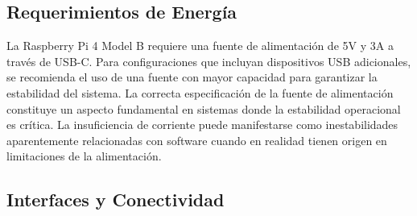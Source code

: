 \subsection{Requerimientos de Energía}

La Raspberry Pi 4 Model B requiere una fuente de alimentación de 5V y 3A a través de USB-C. Para configuraciones que incluyan dispositivos USB adicionales, se recomienda el uso de una fuente con mayor capacidad para garantizar la estabilidad del sistema. La correcta especificación de la fuente de alimentación constituye un aspecto fundamental en sistemas donde la estabilidad operacional es crítica. La insuficiencia de corriente puede manifestarse como inestabilidades aparentemente relacionadas con software cuando en realidad tienen origen en limitaciones de la alimentación.

\subsection{Interfaces y Conectividad}

